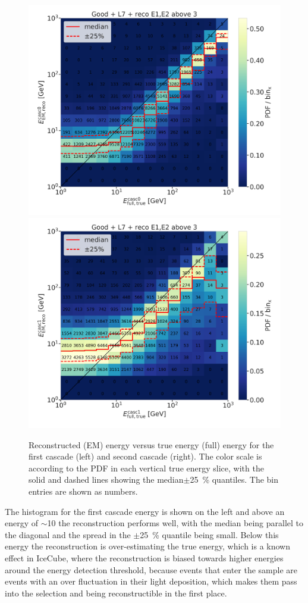 \begin{figure}[h]
	\centering
    \includegraphics[width=0.49\linewidth]{figures/results/190607/resolutions/190607_millipede_level_no_NaNs_NEW_flipped_casc0_reco_energy_vs_casc0_true_energy_reco_above3_step_contours.png}
    \includegraphics[width=0.49\linewidth]{figures/results/190607/resolutions/190607_millipede_level_no_NaNs_NEW_flipped_casc1_reco_energy_vs_casc1_true_energy_reco_above3_step_contours.png}
    \caption[Preliminary 2-d reconstructed versus true cascade energy resolutions]{Reconstructed (EM) energy versus true energy (full) energy for the first cascade (left) and second cascade (right). The color scale is according to the PDF in each vertical true energy slice, with the solid and dashed lines showing the median$\pm$\SI{25}{\percent} quantiles. The bin entries are shown as numbers.}
\end{figure}

The histogram for the first cascade energy is shown on the left and above an energy of $\sim$\SI{10}{\gev} the reconstruction performs well, with the median being parallel to the diagonal and the spread in the $\pm$\SI{25}{\percent} quantile being small. Below this energy the reconstruction is over-estimating the true energy, which is a known effect in IceCube, where the reconstruction is biased towards higher energies around the energy detection threshold, because events that enter the sample are events with an over fluctuation in their light deposition, which makes them pass into the selection and being reconstructible in the first place.

